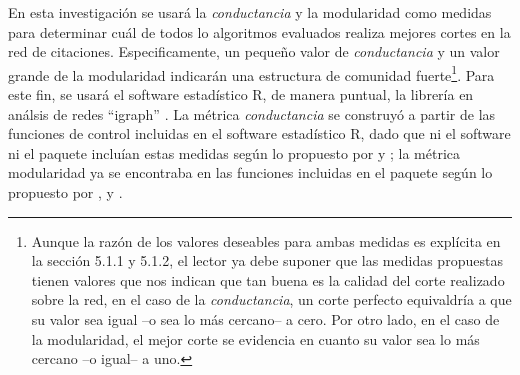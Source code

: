 \documentclass[12pt,letter]{article}
\begin{document}
En esta investigación se usará la \emph{conductancia} y la modularidad como medidas para determinar cuál de todos lo algoritmos evaluados realiza mejores cortes en la red de citaciones. Especificamente, un pequeño valor de \emph{conductancia} y un valor grande de la modularidad indicarán una estructura de comunidad fuerte\footnote{Aunque la razón de los valores deseables para ambas medidas es explícita en la sección 5.1.1 y 5.1.2, el lector ya debe suponer que las medidas propuestas tienen valores que nos indican que tan buena es la calidad del corte realizado sobre la red, en el caso de la \emph{conductancia}, un corte perfecto equivaldría a que su valor sea igual --o sea lo más cercano-- a cero. Por otro lado, en el caso de la modularidad, el mejor corte se evidencia en cuanto su valor sea lo más cercano --o igual-- a uno.}. Para este fin, se usará el software estadístico R, de manera puntual, la librería en análsis de redes ``igraph'' \citep{Csardi}. La métrica \emph{conductancia} se construyó a partir de las funciones de control incluidas en el software estadístico R, dado que ni el software ni el paquete incluían estas medidas según lo propuesto por \cite{Leskovec1, Leskovec2} y \cite{Yang}; la métrica modularidad  ya se encontraba en las funciones incluidas en el paquete según lo propuesto por \cite{Girvan1, Girvan2}, \cite{Leskovec1, Leskovec2} y \cite{Yang}.

\vspace{0.5cm}
\end{document}
